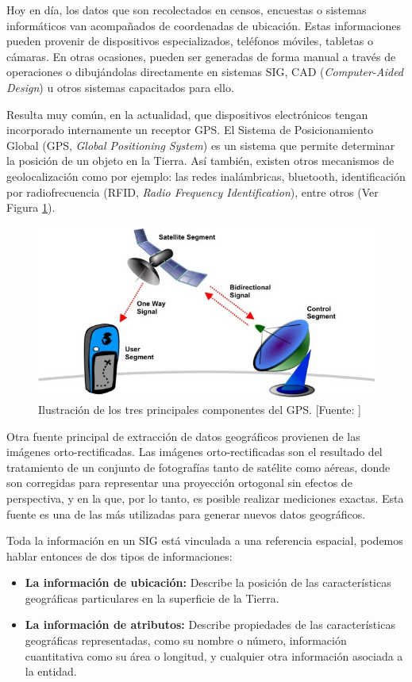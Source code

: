 Hoy en día, los datos que son recolectados en censos, encuestas o sistemas informáticos van acompañados de coordenadas de ubicación. Estas informaciones pueden provenir de dispositivos especializados, teléfonos móviles, tabletas o cámaras. En otras ocasiones, pueden ser generadas de forma manual a través de operaciones o dibujándolas directamente en sistemas SIG, CAD (\textit{Computer-Aided Design}) u otros sistemas capacitados para ello.

Resulta muy común, en la actualidad, que dispositivos electrónicos tengan incorporado internamente un receptor GPS. El Sistema de Posicionamiento Global (GPS, \textit{Global Positioning System}) es un sistema que permite determinar la posición de un objeto en la Tierra. Así también, existen otros mecanismos de geolocalización como por ejemplo: las redes inalámbricas, bluetooth, identificación por radiofrecuencia (RFID, \textit{Radio Frequency Identification}), entre otros (Ver Figura \ref{fig:gps}).

\begin{figure}[H]
    \centering
    \includegraphics[width=11.5cm]{gps.jpg}
    \caption{Ilustración de los tres principales componentes del GPS. [Fuente: \citet{Hinch2010OutdoorGps}]}
    \label{fig:gps}
\end{figure}

Otra fuente principal de extracción de datos geográficos provienen de las imágenes orto-rectificadas. Las imágenes orto-rectificadas son el resultado del tratamiento de un conjunto de fotografías tanto de satélite como aéreas, donde son corregidas para representar una proyección ortogonal sin efectos de perspectiva, y en la que, por lo tanto, es posible realizar mediciones exactas. Esta fuente es una de las más utilizadas para generar nuevos datos geográficos.

Toda la información en un SIG está vinculada a una referencia espacial, podemos hablar entonces de dos tipos de informaciones: 
\begin{itemize}
    \item \textbf{La información de ubicación:} 
    Describe la posición de las características geográficas particulares en la superficie de la Tierra.
    \item \textbf{La información de atributos:} 
    Describe propiedades de las características geográficas representadas, como su nombre o número, información cuantitativa como su área o longitud, y cualquier otra información asociada a la entidad.
\end{itemize}

